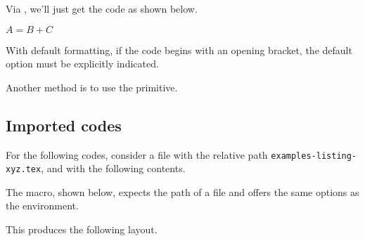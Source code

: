 

\begin{tdocexa}
    Via , we'll just get the code as shown below.

    \begin{tdoclatex}[code]
        $A = B + C$
    \end{tdoclatex}
\end{tdocexa}




\begin{tdocwarn}
    With default formatting, if the code begins with an opening bracket, the default option must be explicitly indicated.


    \smallskip

    Another method is to use the  primitive.

\end{tdocwarn}


\subsection{Imported codes}

For the following codes, consider a file with the relative path \verb+examples-listing-xyz.tex+, and with the following contents.



\medskip

The  macro, shown below, expects the path of a file and offers the same options as the  environment.




\begin{tdocexa}
    \leavevmode

    \begin{tdoclatex}[code]

    \end{tdoclatex}

    This produces the following layout.


\end{tdocexa}


